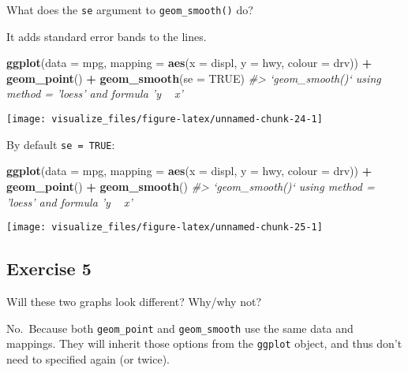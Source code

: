 \documentclass[]{book}
\newenvironment{Shaded}{\begin{snugshade}}{\end{snugshade}}
\newcommand{\CommentTok}[1]{\textcolor[rgb]{0.56,0.35,0.01}{\textit{#1}}}
\newcommand{\DataTypeTok}[1]{\textcolor[rgb]{0.13,0.29,0.53}{#1}}
\newcommand{\KeywordTok}[1]{\textcolor[rgb]{0.13,0.29,0.53}{\textbf{#1}}}
\newcommand{\NormalTok}[1]{#1}
\newcommand{\OperatorTok}[1]{\textcolor[rgb]{0.81,0.36,0.00}{\textbf{#1}}}
\newcommand{\OtherTok}[1]{\textcolor[rgb]{0.56,0.35,0.01}{#1}}
\newcommand{\StringTok}[1]{\textcolor[rgb]{0.31,0.60,0.02}{#1}}
\theoremstyle{plain}
\theoremstyle{remark}
\theoremstyle{definition}
\theoremstyle{definition}
\theoremstyle{definition}
\theoremstyle{remark}
\begin{document}
What does the \texttt{se} argument to \texttt{geom\_smooth()} do?

It adds standard error bands to the lines.

\begin{Shaded}
\begin{Highlighting}[]
\KeywordTok{ggplot}\NormalTok{(}\DataTypeTok{data =}\NormalTok{ mpg, }\DataTypeTok{mapping =} \KeywordTok{aes}\NormalTok{(}\DataTypeTok{x =}\NormalTok{ displ, }\DataTypeTok{y =}\NormalTok{ hwy, }\DataTypeTok{colour =}\NormalTok{ drv)) }\OperatorTok{+}
\StringTok{  }\KeywordTok{geom_point}\NormalTok{() }\OperatorTok{+}
\StringTok{  }\KeywordTok{geom_smooth}\NormalTok{(}\DataTypeTok{se =} \OtherTok{TRUE}\NormalTok{)}
\CommentTok{#> `geom_smooth()` using method = 'loess' and formula 'y ~ x'}
\end{Highlighting}
\end{Shaded}

\begin{center}\texttt{[image: visualize\_files/figure-latex/unnamed-chunk-24-1]} \end{center}

By default \texttt{se\ =\ TRUE}:

\begin{Shaded}
\begin{Highlighting}[]
\KeywordTok{ggplot}\NormalTok{(}\DataTypeTok{data =}\NormalTok{ mpg, }\DataTypeTok{mapping =} \KeywordTok{aes}\NormalTok{(}\DataTypeTok{x =}\NormalTok{ displ, }\DataTypeTok{y =}\NormalTok{ hwy, }\DataTypeTok{colour =}\NormalTok{ drv)) }\OperatorTok{+}
\StringTok{  }\KeywordTok{geom_point}\NormalTok{() }\OperatorTok{+}
\StringTok{  }\KeywordTok{geom_smooth}\NormalTok{()}
\CommentTok{#> `geom_smooth()` using method = 'loess' and formula 'y ~ x'}
\end{Highlighting}
\end{Shaded}

\begin{center}\texttt{[image: visualize\_files/figure-latex/unnamed-chunk-25-1]} \end{center}

\hypertarget{exercise-5-2}{%
\subsection{Exercise 5}\label{exercise-5-2}}

Will these two graphs look different? Why/why not?

No.~Because both \texttt{geom\_point} and \texttt{geom\_smooth} use the
same data and mappings. They will inherit those options from the
\texttt{ggplot} object, and thus don't need to specified again (or
twice).
\end{document}
